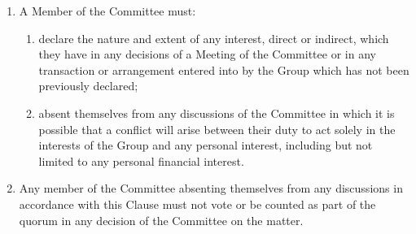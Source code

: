 \documentclass[12pt]{constitution}
\begin{document}

\label{clause:conflicts-interest-loyalities}

\begin{enumerate}
    \item A Member of the Committee must:
    \begin{enumerate}
        \item declare the nature and extent of any interest, direct or indirect, which they have in any decisions of a Meeting of the Committee or in any transaction or arrangement entered into by the Group which has not been previously declared;
        \item absent themselves from any discussions of the Committee in which it is possible that a conflict will arise between their duty to act solely in the interests of the Group and any personal interest, including but not limited to any personal financial interest.
    \end{enumerate}

    \item Any member of the Committee absenting themselves from any discussions in accordance with this Clause must not vote or be counted as part of the quorum in any decision of the Committee on the matter.
\end{enumerate}


\label{clause:disciplinary-action}
\end{document}
